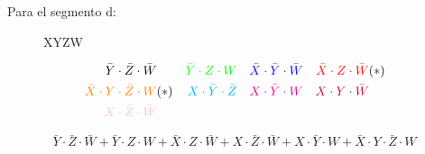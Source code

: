 Para el segmento d:
\begin{figure}[H]
  \centering
    \begin{Karnaugh}{X}{Y}{Z}{W}
    \end{Karnaugh}
\end{figure}

\begin{align*}
  \bar{Y} \cdot \bar{Z} \cdot \bar{W} & &
  \color{green} \bar{Y} \cdot Z \cdot W & &
  \color{blue} \bar{X} \cdot \bar{Y} \cdot \bar{W} & &
  \color{red} \bar{X} \cdot Z \cdot \bar{W} & (*) \\
  \color{orange} \bar{X} \cdot Y \cdot \bar{Z} \cdot W & (*) &
  \color{cyan} X \cdot \bar{Y} \cdot \bar{Z} & &
  \color{magenta} X \cdot \bar{Y} \cdot W & &
  \color{purple} X \cdot Y \cdot \bar{W} \\
  \color{pink} X \cdot \bar{Z} \cdot \bar{W} & &
\end{align*}

\begin{equation*}
  \bar{Y} \cdot \bar{Z} \cdot \bar{W} +
  \bar{Y} \cdot Z \cdot W +
  \bar{X} \cdot Z \cdot \bar{W} +
  X \cdot \bar{Z} \cdot \bar{W} +
  X \cdot \bar{Y} \cdot W +
  \bar{X} \cdot Y \cdot \bar{Z} \cdot W
\end{equation*}

